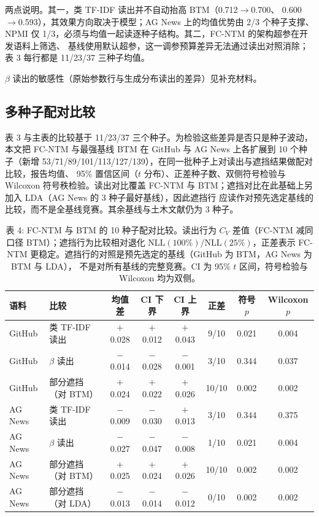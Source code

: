 \documentclass{article}
\begin{document}
两点说明。其一，类 TF-IDF 读出并不自动抬高 BTM（0.712$\rightarrow$0.700、
0.600$\rightarrow$0.593），其效果方向取决于模型；AG News 上的均值优势由 2/3 个种子支撑、
NPMI 仅 1/3，必须与均值一起读逐种子结构。其二，FC-NTM 的架构超参在开发语料上筛选、
基线使用默认超参，这一调参预算差异无法通过读出对照消除；表 3 每行都是
11/23/37 三种子均值。

$\beta$ 读出的敏感性（原始参数行与生成分布读出的差异）见补充材料。

\subsection{多种子配对比较}
\label{sec:seed-extension}

表 3 与主表的比较基于 11/23/37 三个种子。为检验这些差异是否只是种子波动，
本文把 FC-NTM 与最强基线 BTM 在 GitHub 与 AG News 上各扩展到 10 个种子（新增
53/71/89/101/113/127/139），在同一批种子上对读出与遮挡结果做配对比较，报告均值、
95\% 置信区间（$t$ 分布）、正差种子数、双侧符号检验与 Wilcoxon 符号秩检验。读出对比覆盖
FC-NTM 与 BTM；遮挡对比在此基础上另加入 LDA（AG News 的 3 种子最好基线），因此遮挡行
应读作对预先选定基线的比较，而不是全基线竞赛。其余基线与土木文献仍为 3 种子。

\begin{table}[t]
\centering
\caption{表 4: FC-NTM 与 BTM 的 10 种子配对比较。读出行为 $C_V$ 差值（FC-NTM 减同口径
BTM）；遮挡行为比较相对退化 $\mathrm{NLL}(100\%)/\mathrm{NLL}(25\%)$，正差表示 FC-NTM
更稳定。遮挡行的对照是预先选定的基线（GitHub 为 BTM，AG News 为 BTM 与 LDA），
不是对所有基线的完整竞赛。CI 为 95\% $t$ 区间，符号检验与 Wilcoxon 均为双侧。}
\label{tab:seed-paired}
\small
\setlength{\tabcolsep}{4pt}
\begin{tabular}{@{}llcccccc@{}}
\toprule
语料 & 比较 & 均值差 & CI 下界 & CI 上界 & 正差 & 符号 $p$ & Wilcoxon $p$ \\
\midrule
GitHub & 类 TF-IDF 读出 & $+$0.028 & $+$0.012 & $+$0.043 & 9/10 & 0.021 & 0.004 \\
GitHub & $\beta$ 读出 & $-$0.014 & $-$0.028 & $-$0.001 & 3/10 & 0.344 & 0.037 \\
GitHub & 部分遮挡（对 BTM） & $+$0.024 & $+$0.022 & $+$0.026 & 10/10 & 0.002 & 0.002 \\
\midrule
AG News & 类 TF-IDF 读出 & $-$0.009 & $-$0.030 & $+$0.013 & 3/10 & 0.344 & 0.375 \\
AG News & $\beta$ 读出 & $-$0.027 & $-$0.047 & $-$0.008 & 1/10 & 0.021 & 0.004 \\
AG News & 部分遮挡（对 BTM） & $+$0.025 & $+$0.024 & $+$0.026 & 10/10 & 0.002 & 0.002 \\
AG News & 部分遮挡（对 LDA） & $-$0.013 & $-$0.014 & $-$0.012 & 0/10 & 0.002 & 0.002 \\
\bottomrule
\end{tabular}
\end{table}
\end{document}
